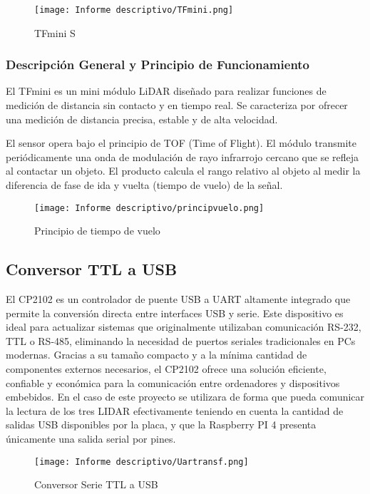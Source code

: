 \documentclass[12pt,a4paper]{article}
\begin{document}
\begin{figure}[H]
    \centering
    \texttt{[image: Informe descriptivo/TFmini.png]}
    \caption{TFmini S}
\end{figure}

\subsubsection{Descripción General y Principio de Funcionamiento}

El TFmini es un mini módulo LiDAR diseñado para realizar funciones de medición de distancia sin contacto y en tiempo real. Se caracteriza por ofrecer una medición de distancia precisa, estable y de alta velocidad.

El sensor opera bajo el principio de TOF (Time of Flight). El módulo transmite periódicamente una onda de modulación de rayo infrarrojo cercano que se refleja al contactar un objeto. El producto calcula el rango relativo al objeto al medir la diferencia de fase de ida y vuelta (tiempo de vuelo) de la señal.

\begin{figure}[H]
    \centering
    \texttt{[image: Informe descriptivo/principvuelo.png]}
    \caption{Principio de tiempo de vuelo}
    \label{fig:placeholder}
\end{figure}

\subsection{Conversor TTL a USB}

El CP2102 es un controlador de puente USB a UART altamente integrado que permite la conversión directa entre interfaces USB y serie. Este dispositivo es ideal para actualizar sistemas que originalmente utilizaban comunicación RS-232, TTL o RS-485, eliminando la necesidad de puertos seriales tradicionales en PCs modernas.  
Gracias a su tamaño compacto y a la mínima cantidad de componentes externos necesarios, el CP2102 ofrece una solución eficiente, confiable y económica para la comunicación entre ordenadores y dispositivos embebidos.
En el caso de este proyecto se utilizara de forma que pueda comunicar la lectura de los tres LIDAR efectivamente teniendo en cuenta la cantidad de salidas USB disponibles por la placa, y que la Raspberry PI 4 presenta únicamente una salida serial por pines.

\begin{figure}[H]
\centering
\texttt{[image: Informe descriptivo/Uartransf.png]}
\caption{Conversor Serie TTL a USB}
\end{figure}
\end{document}
